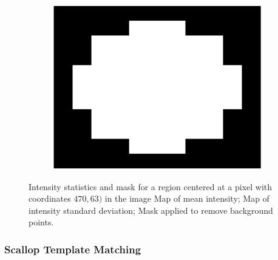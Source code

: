 \documentclass {udthesis}
\begin{document}
\begin{figure}
\begin{subfigure}[]{0.3\textwidth}
      \includegraphics[width=\textwidth]{mask_centered}
      \caption{}
      \label{subfig:mask_scallop}
  \end{subfigure}
  \caption{Intensity statistics and mask for a region centered at a pixel with coordinates $470,63)$ in the image  Map of mean intensity;  Map of intensity standard deviation;
   Mask applied to remove background points.}
  \label{fig:scallop_learning_mask}
\end{figure}


\subsubsection{Scallop Template Matching} \label{subsubsec:scallop_template_matching}
\end{document}
